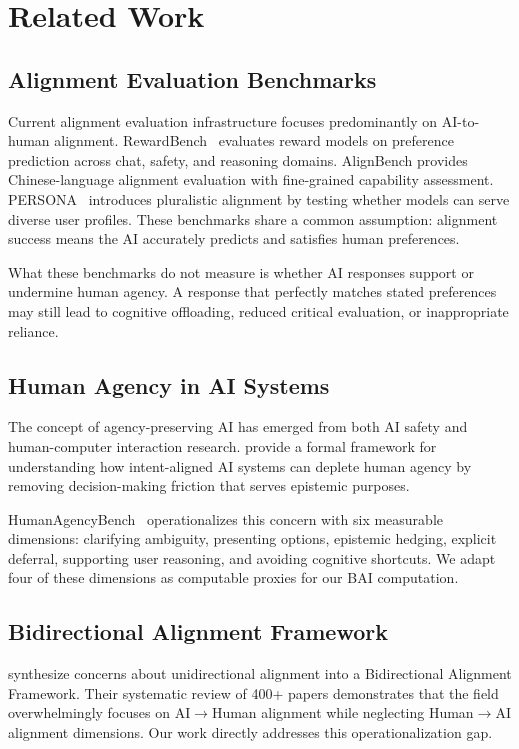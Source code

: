 \section{Related Work}

\subsection{Alignment Evaluation Benchmarks}

Current alignment evaluation infrastructure focuses predominantly on AI-to-human alignment. RewardBench~\citep{Lambert2024} evaluates reward models on preference prediction across chat, safety, and reasoning domains. AlignBench provides Chinese-language alignment evaluation with fine-grained capability assessment. PERSONA~\citep{PERSONA2024} introduces pluralistic alignment by testing whether models can serve diverse user profiles. These benchmarks share a common assumption: alignment success means the AI accurately predicts and satisfies human preferences.

What these benchmarks do not measure is whether AI responses support or undermine human agency. A response that perfectly matches stated preferences may still lead to cognitive offloading, reduced critical evaluation, or inappropriate reliance.

\subsection{Human Agency in AI Systems}

The concept of agency-preserving AI has emerged from both AI safety and human-computer interaction research. \citet{Mitelut2023} provide a formal framework for understanding how intent-aligned AI systems can deplete human agency by removing decision-making friction that serves epistemic purposes.

HumanAgencyBench~\citep{HumanAgencyBench2024} operationalizes this concern with six measurable dimensions: clarifying ambiguity, presenting options, epistemic hedging, explicit deferral, supporting user reasoning, and avoiding cognitive shortcuts. We adapt four of these dimensions as computable proxies for our BAI computation.

\subsection{Bidirectional Alignment Framework}

\citet{Shen2024} synthesize concerns about unidirectional alignment into a Bidirectional Alignment Framework. Their systematic review of 400+ papers demonstrates that the field overwhelmingly focuses on AI$\rightarrow$Human alignment while neglecting Human$\rightarrow$AI alignment dimensions. Our work directly addresses this operationalization gap.


